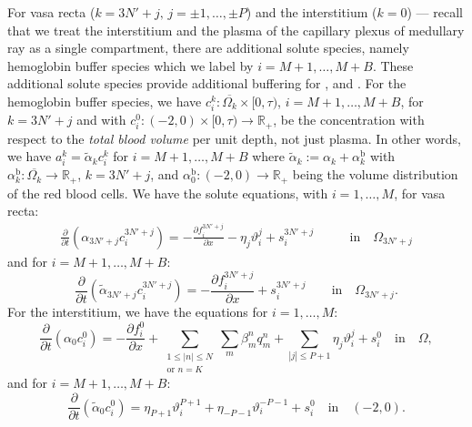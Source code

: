 \documentclass{article}
\begin{document}
For vasa recta ($k=3N'+j,\,j=\pm 1,\dots,\pm P$) and the interstitium ($k=0$) --- recall that we treat the interstitium and the plasma of the capillary plexus of medullary ray as a single compartment, there are additional solute species, namely hemoglobin buffer species which we label by $i=M+1,\dots,M+B$.
These additional solute species provide additional buffering for , and .
For the hemoglobin buffer species, we have $c_i^k:\overline{\Omega_k}\times [0,\tau)$, $i=M+1,\dots,M+B$, for $k=3N'+j$ and with $c_i^0:(-2,0)\times [0,\tau)\to \mathbb{R}_+$, be the concentration with respect to the \textit{total blood volume} per unit depth, not just plasma.
In other words, we have $a_i^k = \tilde{\alpha}_kc_i^k$ for $i=M+1,\dots,M+B$ where $\tilde{\alpha}_k:=\alpha_k+\alpha_k^\mathrm{b}$ with $\alpha_k^\mathrm{b}:\overline{\Omega_k}\to \mathbb{R}_+$, $k=3N'+j$, and $\alpha^\mathrm{b}_0:(-2,0)\to \mathbb{R}_+$ being the volume distribution of the red blood cells.
We have the solute equations, with $i=1,\dots,M$, for vasa recta:
\begin{align}
    \frac{\partial }{\partial t}(\alpha_{3N'+j}c_i^{3N'+j}) = - \frac{\partial f_i^{3N'+j}}{\partial x} -\eta_{j}\vartheta_i^j+s_i^{3N'+j}\qquad &\text{in}\quad \Omega_{3N'+j}
\end{align}
    and for $i=M+1,\dots,M+B$:
\begin{equation}\label{eq:vr_sol}
    \frac{\partial }{\partial t}(\tilde{\alpha}_{3N'+j}c_i^{3N'+j}) = - \frac{\partial f_i^{3N'+j}}{\partial x} +s_i^{3N'+j}\qquad \text{in}\quad \Omega_{3N'+j}.
\end{equation}
For the interstitium, we have the equations for $i=1,\dots,M$:
\begin{equation}\label{eq:int_sol}
    \frac{\partial}{\partial t}(\alpha_0 c_i^0) = - \frac{\partial f_i^0}{\partial x} + 
        \sum_{\substack{1\leq|n|\leq N\\\text{or } n=K}}\sum_m\beta_m^nq_m^n+\sum_{|j|\leq P+1}\eta_j\vartheta_i^j+s_i^0\quad \text{in}\quad \Omega,
\end{equation}
    and for $i=M+1,\dots,M+B$:
\begin{equation}
    \frac{\partial}{\partial t}(\tilde{\alpha}_0 c_i^0) = 
    \eta_{P+1}\vartheta_i^{P+1}+\eta_{-P-1}\vartheta_i^{-P-1}+s_i^0\quad \text{in}\quad (-2,0).
\end{equation}
\end{document}
